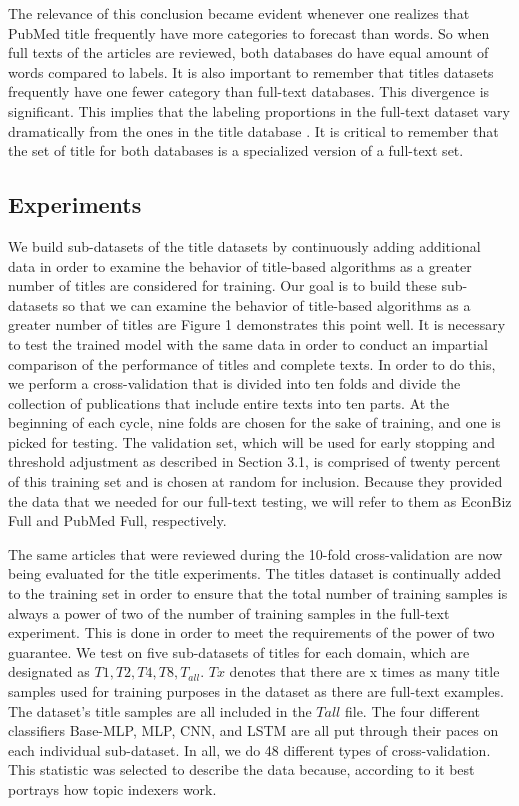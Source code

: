 \documentclass[a4paper]{article}
\begin{document}
The relevance of this conclusion became evident whenever one realizes that PubMed title frequently have more categories to forecast than words. So when full texts of the articles are reviewed, both databases do have equal amount of words compared to labels. It is also important to remember that titles datasets frequently have one fewer category than full-text databases. This divergence is significant. This implies that the labeling proportions in the full-text dataset vary dramatically from the ones in the title database \cite{Wang:2012:BBS:2390665.2390688}. It is critical to remember that the set of title for both databases is a specialized version of a full-text set.

\subsection{Experiments}
We build sub-datasets of the title datasets by continuously adding additional data in order to examine the behavior of title-based algorithms as a greater number of titles are considered for training. Our goal is to build these sub-datasets so that we can examine the behavior of title-based algorithms as a greater number of titles are Figure 1 demonstrates this point well. It is necessary to test the trained model with the same data in order to conduct an impartial comparison of the performance of titles and complete texts. In order to do this, we perform a cross-validation that is divided into ten folds and divide the collection of publications that include entire texts into ten parts. At the beginning of each cycle, nine folds are chosen for the sake of training, and one is picked for testing. The validation set, which will be used for early stopping and threshold adjustment as described in Section 3.1, is comprised of twenty percent of this training set and is chosen at random for inclusion. Because they provided the data that we needed for our full-text testing, we will refer to them as EconBiz Full and PubMed Full, respectively.

The same articles that were reviewed during the 10-fold cross-validation are now being evaluated for the title experiments. The titles dataset is continually added to the training set in order to ensure that the total number of training samples is always a power of two of the number of training samples in the full-text experiment. This is done in order to meet the requirements of the power of two guarantee. We test on five sub-datasets of titles for each domain, which are designated as $T1, T2, T4, T8,  T_{all}$. $Tx$ denotes that there are x times as many title samples used for training purposes in the dataset as there are full-text examples. The dataset's title samples are all included in the $Tall$ file. The four different classifiers Base-MLP, MLP, CNN, and LSTM are all put through their paces on each individual sub-dataset. In all, we do 48 different types of cross-validation. This statistic was selected to describe the data because, according to \cite{goossen2011news} it best portrays how topic indexers work.
\end{document}
